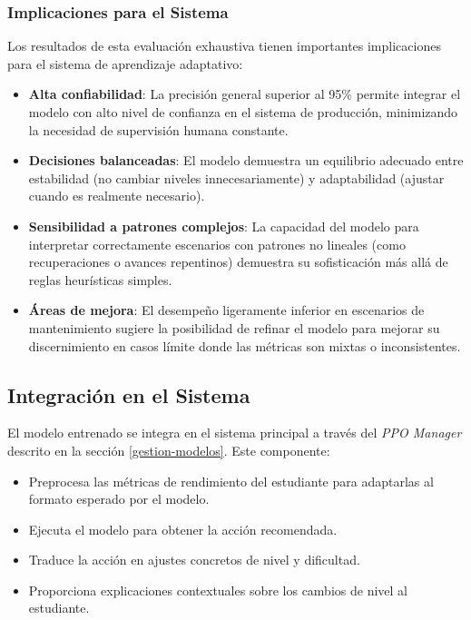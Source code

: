 \subsubsection{Implicaciones para el Sistema}

Los resultados de esta evaluación exhaustiva tienen importantes implicaciones para el sistema de aprendizaje adaptativo:

\begin{itemize}
    \item \textbf{Alta confiabilidad}: La precisión general superior al 95\% permite integrar el modelo con alto nivel de confianza en el sistema de producción, minimizando la necesidad de supervisión humana constante.
    
    \item \textbf{Decisiones balanceadas}: El modelo demuestra un equilibrio adecuado entre estabilidad (no cambiar niveles innecesariamente) y adaptabilidad (ajustar cuando es realmente necesario).
    
    \item \textbf{Sensibilidad a patrones complejos}: La capacidad del modelo para interpretar correctamente escenarios con patrones no lineales (como recuperaciones o avances repentinos) demuestra su sofisticación más allá de reglas heurísticas simples.
    
    \item \textbf{Áreas de mejora}: El desempeño ligeramente inferior en escenarios de mantenimiento sugiere la posibilidad de refinar el modelo para mejorar su discernimiento en casos límite donde las métricas son mixtas o inconsistentes.
\end{itemize}

\subsection{Integración en el Sistema}
\label{integracion-sistema-ppo}

El modelo entrenado se integra en el sistema principal a través del \textit{PPO Manager} descrito en la sección \ref{gestion-modelos}. Este componente:

\begin{itemize}
    \item Preprocesa las métricas de rendimiento del estudiante para adaptarlas al formato esperado por el modelo.
    \item Ejecuta el modelo para obtener la acción recomendada.
    \item Traduce la acción en ajustes concretos de nivel y dificultad.
    \item Proporciona explicaciones contextuales sobre los cambios de nivel al estudiante.
\end{itemize}

